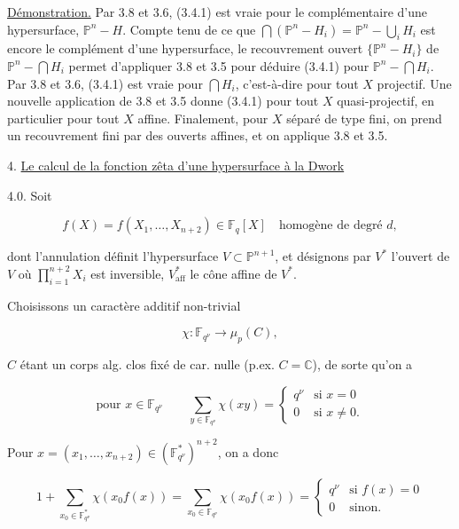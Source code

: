 
\underline{Démonstration.} Par 3.8 et 3.6, (3.4.1) est vraie pour le
complémentaire d'une hypersurface, $\mathbb P^n-H$. Compte tenu de ce que $\bigcap(\mathbb P^n-H_i)=\mathbb P^n-\bigcup_iH_i$ est encore le complément d'une hypersurface, le recouvrement ouvert
$\{\mathbb P^n-H_i\}$ de $\mathbb P^n-\bigcap H_i$ permet d'appliquer 3.8 et
3.5 pour déduire (3.4.1) pour $\mathbb P^n-\bigcap H_i$. Par 3.8 et 3.6,
(3.4.1) est vraie pour $\bigcap H_i$, c'est-à-dire pour tout $X$ projectif.
Une nouvelle application de 3.8 et 3.5 donne (3.4.1) pour tout $X$
quasi-projectif, en particulier pour tout $X$ affine. Finalement, pour $X$
séparé de type fini, on prend un recouvrement fini par des ouverts affines,
et on applique 3.8 et 3.5.

4. \underline{Le calcul de la fonction zêta d'une hypersurface à la Dwork}

4.0. Soit

\begin{equation}\tag{4.0.1}
f(X)=f(X_1,\ldots,X_{n+2})\in\mathbb F_q[X]
\quad\text{homogène de degré }d,
\end{equation}

dont l'annulation définit l'hypersurface $V\subset\mathbb P^{n+1}$, et
désignons par $V^*$ l'ouvert de $V$ où
$\prod_{i=1}^{n+2}X_i$ est inversible, $V^*_{\mathrm{aff}}$ le cône affine
de $V^*$.

Choisissons un caractère additif non-trivial

\begin{equation}\tag{4.0.2}
\chi:\mathbb F_{q^\nu}\longrightarrow\mu_p(C),
\end{equation}

$C$ étant un corps alg. clos fixé de car. nulle
(p.ex. $C=\mathbb C$), de sorte qu'on a

\begin{equation}\tag{4.0.3}
\text{pour }x\in\mathbb F_{q^\nu}\qquad
\sum_{y\in\mathbb F_{q^\nu}}\chi(xy)=
\begin{cases}
q^\nu&\text{si }x=0\\
0&\text{si }x\ne0.
\end{cases}
\end{equation}

Pour $x=(x_1,\ldots,x_{n+2})\in(\mathbb F_{q^\nu}^*)^{n+2}$, on a donc


\begin{equation}\tag{4.0.4}
1+\sum_{x_0\in\mathbb F_{q^\nu}^*}\chi(x_0f(x))
=\sum_{x_0\in\mathbb F_{q^\nu}}\chi(x_0f(x))
=
\begin{cases}
q^\nu&\text{si }f(x)=0\\
0&\text{sinon}.
\end{cases}
\end{equation}

